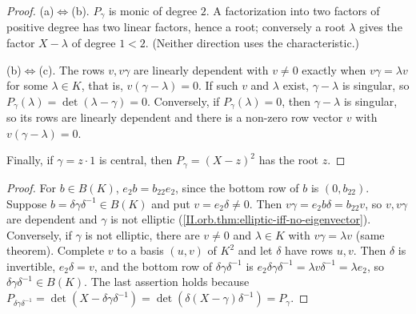 \begin{theorem}
\end{theorem}
\begin{proof}
(a)$\Leftrightarrow$(b). $P_\gamma$ is monic of degree $2$. A factorization into two factors of positive degree has two linear
factors, hence a root; conversely a root $\lambda$ gives the factor $X-\lambda$ of degree $1<2$. (Neither direction uses the characteristic.)

(b)$\Leftrightarrow$(c). The rows $v,v\gamma$ are linearly dependent with $v\ne0$ exactly when $v\gamma=\lambda v$ for some $\lambda\in K$, that is,
$v(\gamma-\lambda)=0$. If such $v$ and $\lambda$ exist, $\gamma-\lambda$ is singular, so $P_\gamma(\lambda)=\det(\lambda-\gamma)=0$. Conversely, if
$P_\gamma(\lambda)=0$, then $\gamma-\lambda$ is singular, so its rows are linearly dependent and there is a non-zero row vector $v$ with
$v(\gamma-\lambda)=0$.

Finally, if $\gamma=z\cdot1$ is central, then $P_\gamma=(X-z)^2$ has the root $z$.
\end{proof}

\begin{theorem}
\end{theorem}
\begin{proof}
For $b\in B(K)$, $e_2b=b_{22}e_2$, since the bottom row of $b$ is $(0,b_{22})$.
Suppose $b=\delta\gamma\delta^{-1}\in B(K)$ and put $v=e_2\delta\ne0$. Then $v\gamma=e_2b\delta=b_{22}v$, so $v,v\gamma$ are dependent and
$\gamma$ is not elliptic (\cref{II.orb.thm:elliptic-iff-no-eigenvector}). Conversely, if $\gamma$ is not elliptic, there are $v\ne0$ and
$\lambda\in K$ with $v\gamma=\lambda v$ (same theorem). Complete $v$ to a basis $(u,v)$ of $K^2$ and let $\delta$ have rows $u,v$. Then $\delta$ is
invertible, $e_2\delta=v$, and the bottom row of $\delta\gamma\delta^{-1}$ is $e_2\delta\gamma\delta^{-1}=\lambda v\delta^{-1}=\lambda e_2$, so
$\delta\gamma\delta^{-1}\in B(K)$. The last assertion holds because $P_{\delta\gamma\delta^{-1}}=\det(X-\delta\gamma\delta^{-1})=\det(\delta(X-\gamma)\delta^{-1})=P_\gamma$.
\end{proof}

